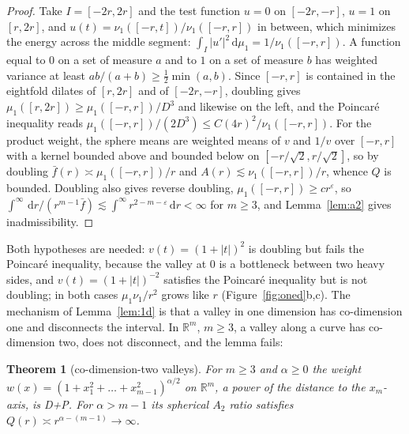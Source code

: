 \documentclass[11pt]{amsart}
\newcommand{\R}{\mathbb{R}}
\newcommand{\dd}{\,\mathrm{d}}
\newcommand{\abs}[1]{\lvert #1\rvert}
\newcommand{\fbar}{\bar f}
\theoremstyle{plain}
\newtheorem{theorem}{Theorem}[section]
\theoremstyle{definition}
\theoremstyle{remark}
\begin{document}
\begin{proof}
Take $I=[-2r,2r]$ and the test function $u=0$ on $[-2r,-r]$, $u=1$ on $[r,2r]$,
and $u(t)=\nu_1([-r,t])/\nu_1([-r,r])$ in between, which minimizes the energy
across the middle segment: $\int_I\abs{u'}^2\dd\mu_1=1/\nu_1([-r,r])$. A function
equal to $0$ on a set of measure $a$ and to $1$ on a set of measure $b$ has
weighted variance at least $ab/(a+b)\ge\frac12\min(a,b)$. Since $[-r,r]$ is
contained in the eightfold dilates of $[r,2r]$ and of $[-2r,-r]$, doubling gives
$\mu_1([r,2r])\ge\mu_1([-r,r])/D^3$ and likewise on the left, and the Poincar\'e
inequality reads $\mu_1([-r,r])/(2D^3)\le C(4r)^2/\nu_1([-r,r])$. For the product
weight, the sphere means are weighted means of $v$ and $1/v$ over $[-r,r]$
with a kernel bounded above and bounded below on $[-r/\sqrt2,r/\sqrt2]$, so by
doubling $\fbar(r)\asymp\mu_1([-r,r])/r$ and $A(r)\lesssim\nu_1([-r,r])/r$,
whence $Q$ is bounded. Doubling also gives reverse doubling,
$\mu_1([-r,r])\ge cr^\varepsilon$, so $\int^\infty\dd r/(r^{m-1}\fbar)\lesssim
\int^\infty r^{2-m-\varepsilon}\dd r<\infty$ for $m\ge3$, and Lemma~\ref{lem:a2}
gives inadmissibility.
\end{proof}

Both hypotheses are needed: $v(t)=(1+\abs t)^2$ is doubling but fails the
Poincar\'e inequality, because the valley at $0$ is a bottleneck between two
heavy sides, and $v(t)=(1+\abs t)^{-2}$ satisfies the Poincar\'e inequality
but is not doubling; in both cases $\mu_1\nu_1/r^2$ grows like $r$
(Figure~\ref{fig:oned}b,c). The mechanism of Lemma~\ref{lem:1d} is that a valley
in one dimension has co-dimension one and disconnects the interval. In $\R^m$,
$m\ge3$, a valley along a curve has co-dimension two, does not disconnect, and
the lemma fails:

\begin{theorem}[co-dimension-two valleys]\label{thm:cyl}
For $m\ge3$ and $\alpha\ge0$ the weight
$w(x)=(1+x_1^2+\dots+x_{m-1}^2)^{\alpha/2}$ on $\R^m$, a power of the distance to
the $x_m$-axis, is D+P. For $\alpha>m-1$ its spherical $A_2$ ratio satisfies
$Q(r)\asymp r^{\alpha-(m-1)}\to\infty$.
\end{theorem}
\end{document}
